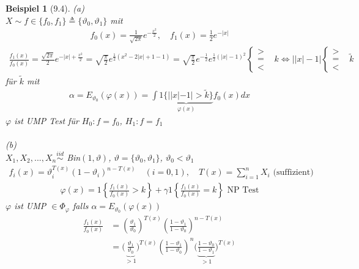 \documentclass[a4paper,openany]{book}
\theoremstyle{mytheoremstyle}
\newtheorem*{bei}{Beispiel}
\theoremstyle{mytheoremstyle2}
\begin{document}
\begin{bei}[9.4]
  (a) \\
  $X\sim f \in \{f_0,f_1\}\triangleq \{\vartheta _0,\vartheta _1\}$ mit 
  \begin{align*}
    f_0(x)=\frac{1}{\sqrt{2 \pi }}e^{-\frac{x^2}{2}}, \quad f_1(x)=\frac{1}{2}e^{-|x|}
  \end{align*}
  \begin{align*}
    \frac{f_1(x)}{f_0(x)}=\frac{\sqrt{2 \pi }}{2}e^{-|x|+\frac{x^2}{2}}=\sqrt{\frac{\pi }{2}}e^{\frac{1}{2}(x^2-2|x|+1-1)}=\sqrt{\frac{\pi }{2}}e^{-\frac{1}{2}}e^{\frac{1}{2}(|x|-1)^2}\begin{cases}
      > &\\
      = \\
      <
    \end{cases}k \Leftrightarrow \left||x|-1\right|\begin{cases}
      > &\\
      = \\
      <
    \end{cases}\tilde{k}
  \end{align*}
    für $\tilde{k}$ mit 
  \begin{align*}
    \alpha =E _{\vartheta _0}(\varphi (x))=\int{\underbrace{1 \{||x|-1|>\tilde{k}\}}_{\varphi (x)}f_0(x)dx}
  \end{align*}
  $\varphi $ ist UMP Test für $H_0:f=f_0$, $H_1:f=f_1$   \\\\
  (b) \\
  $X_1,X_2,...,X_n \overset{iid}\sim$ Bin$(1,\vartheta )$, $\vartheta =\{\vartheta _0,\vartheta _1\}$, $\vartheta _0<\vartheta _1$
  \begin{align*}
    f_i(x)=\vartheta _i^{T(x)}(1-\vartheta _i)^{n-T(x)}\quad (i=0,1),\quad T(x)=\sum_{i=1}^{n}{X_i} \text{ (suffizient)}
  \end{align*}
  \begin{align*}
    \varphi (x)=1 \left\{\frac{f_1(x)}{f_0(x)}>k\right\}+\gamma 1 \left\{\frac{f_1(x)}{f_0(x)}=k\right\} \text{ NP Test}
  \end{align*}
  $\varphi $ ist UMP $\in \Phi _{\varphi }$ falls $\alpha =E _{\vartheta _0}(\varphi (x))$
  \begin{align*}
    \frac{f_1(x)}{f_0(x)}
    &=\left(\frac{\vartheta _1}{\vartheta _0}\right)^{T(x)}\left(\frac{1-\vartheta _1}{1-\vartheta _0}\right)^{n-T(x)} \\
    &=\bigg(\underbrace{\frac{\vartheta _1}{\vartheta _0}}_{>1}\bigg)^{T(x)}\left(\frac{1-\vartheta _1}{1-\vartheta _0}\right)^{n}\bigg(\underbrace{\frac{1-\vartheta _0}{1-\vartheta _1}}_{>1}\bigg)^{T(x)} \\

\end{align*}
\end{bei}
\end{document}
